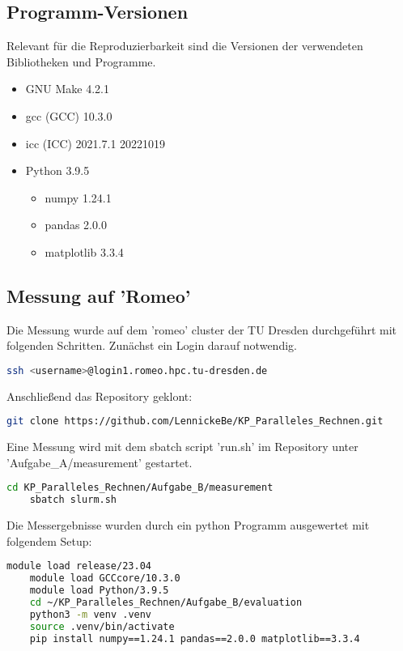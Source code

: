 \documentclass[plainarticle,zihtitle,german,final,hyperref,utf8]{zihpub}
\begin{document}
\subsection{Programm-Versionen}
Relevant für die Reproduzierbarkeit sind die Versionen der verwendeten Bibliotheken und Programme.
\begin{itemize}
	\item GNU Make 4.2.1
	\item gcc (GCC) 10.3.0
	\item icc (ICC) 2021.7.1 20221019
	\item Python 3.9.5
	\begin{itemize}
		\item numpy 1.24.1
		\item pandas 2.0.0
		\item matplotlib 3.3.4
	\end{itemize}
\end{itemize}
\subsection{Messung auf 'Romeo'}
Die Messung wurde auf dem 'romeo' cluster der TU Dresden durchgeführt mit folgenden Schritten.
Zunächst ein Login darauf notwendig.
\begin{lstlisting}[language=bash]
	ssh <username>@login1.romeo.hpc.tu-dresden.de
\end{lstlisting}

Anschließend das Repository geklont:
\begin{lstlisting}[language=bash]
	git clone https://github.com/LennickeBe/KP_Paralleles_Rechnen.git
\end{lstlisting}

Eine Messung wird mit dem sbatch script 'run.sh' im Repository unter 'Aufgabe\_A/measurement' gestartet.

\begin{lstlisting}[language=bash]
	cd KP_Paralleles_Rechnen/Aufgabe_B/measurement
	sbatch slurm.sh
\end{lstlisting}

Die Messergebnisse wurden durch ein python Programm ausgewertet mit folgendem Setup:
\begin{lstlisting}[language=bash]
	module load release/23.04
	module load GCCcore/10.3.0
	module load Python/3.9.5
	cd ~/KP_Paralleles_Rechnen/Aufgabe_B/evaluation
	python3 -m venv .venv
	source .venv/bin/activate
	pip install numpy==1.24.1 pandas==2.0.0 matplotlib==3.3.4
\end{lstlisting}
\end{document}
